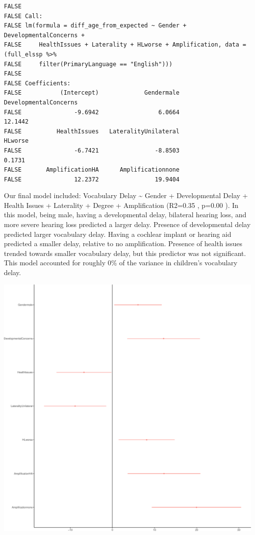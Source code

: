 \documentclass[english,man]{apa6}
\begin{document}
\begin{verbatim}
FALSE 
FALSE Call:
FALSE lm(formula = diff_age_from_expected ~ Gender + DevelopmentalConcerns + 
FALSE     HealthIssues + Laterality + HLworse + Amplification, data = (full_elssp %>% 
FALSE     filter(PrimaryLanguage == "English")))
FALSE 
FALSE Coefficients:
FALSE           (Intercept)             Gendermale  DevelopmentalConcerns  
FALSE               -9.6942                 6.0664                12.1442  
FALSE          HealthIssues   LateralityUnilateral                HLworse  
FALSE               -6.7421                -8.8503                 0.1731  
FALSE       AmplificationHA      Amplificationnone  
FALSE               12.2372                19.9404
\end{verbatim}

Our final model included: Vocabulary Delay \textasciitilde{} Gender + Developmental Delay + Health Issues + Laterality + Degree + Amplification (R2=0.35 , p=0.00 ). In this model, being male, having a developmental delay, bilateral hearing loss, and more severe hearing loss predicted a larger delay. Presence of developmental delay predicted larger vocabulary delay. Having a cochlear implant or hearing aid predicted a smaller delay, relative to no amplification. Presence of health issues trended towards smaller vocabulary delay, but this predictor was not significant.
This model accounted for roughly 0\% of the variance in children's vocabulary delay.

\includegraphics{ELSSP_paper_files/figure-latex/delay-betas-1.pdf}
\end{document}
